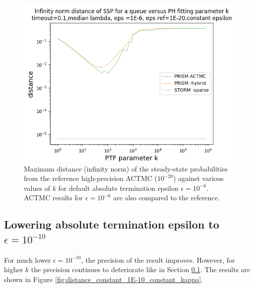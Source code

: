 \documentclass[paper=a4, fontsize=11pt]{scrartcl}
\numberwithin{equation}{section}		%
\numberwithin{figure}{section}			%
\numberwithin{table}{section}				%
\begin{document}
	\begin{figure}[H]
		\begin{center}
			\includegraphics[trim=0.3cm 0cm 0cm 1.35cm,width=15cm, clip]{picture/New_model/1E-6/distance_constant_1E-6.png}
		\end{center}
		\caption{Maximum distance (infinity norm) of the steady-state probabilities from the reference high-precision ACTMC ($10^{-20}$) against various values of $k$ for default absolute termination epsilon $\epsilon = 10^{-6}$. ACTMC results for $\epsilon = 10^{-6}$ are also compared to the reference.}
		\label{fig:distance_constant_standard_constant_kappa}
	\end{figure}
	
	\pagebreak
	\subsection{Lowering absolute termination epsilon to $\epsilon = 10^{-10}$}
	\label{S:2.2}
	
	For much lower $\epsilon = 10^{-10}$, the precision of the result improves. However, for higher $k$ the precision continues to deteriorate like in Section \ref{S:2.2}. The results are shown in Figure \ref{fig:distance_constant_1E-10_constant_kappa}.
	
\end{document}
